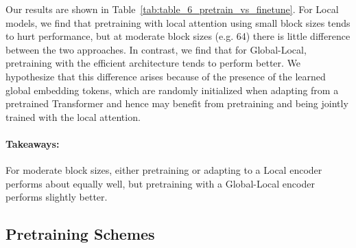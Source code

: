 \documentclass[11pt]{article}
\begin{document}
Our results are shown in Table~\ref{tab:table_6_pretrain_vs_finetune}.
For Local models, we find that pretraining with local attention using small block sizes tends to hurt performance, but at moderate block sizes (e.g. 64) there is little difference between the two approaches.
In contrast, we find that for Global-Local, pretraining with the efficient architecture tends to perform better.
We hypothesize that this difference arises because of the presence of the learned global embedding tokens, which are randomly initialized when adapting from a pretrained Transformer and hence may benefit from pretraining and being jointly trained with the local attention.

\paragraph{Takeaways:} For moderate block sizes, either pretraining or adapting to a Local encoder performs about equally well, but pretraining with a Global-Local encoder performs slightly better.



\subsection{Pretraining Schemes}
\end{document}
